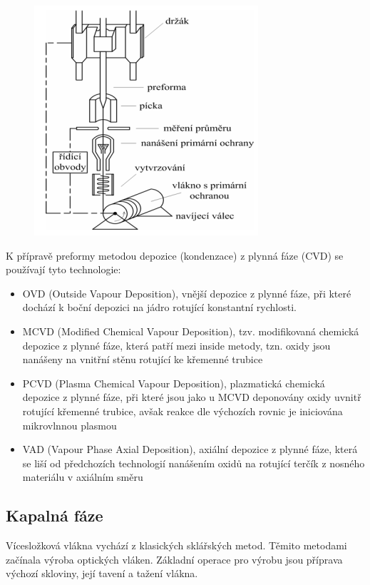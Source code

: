 \begin{figure}[!ht]
\begin{center}
    \includegraphics[scale=1]{obrazky/preforma.png}
  \end{center}
\end{figure}

K přípravě preformy metodou depozice (kondenzace) z plynná fáze (CVD) se používají tyto technologie:
\begin{itemize}
    \item OVD (Outside Vapour Deposition), vnější depozice z plynné fáze, při které dochází k boční depozici na jádro rotující konstantní rychlosti.
    \item MCVD (Modified Chemical Vapour Deposition), tzv. modifikovaná chemická depozice z plynné fáze, která patří mezi inside metody, tzn. oxidy jsou nanášeny na vnitřní stěnu rotující ke křemenné trubice
    \item PCVD (Plasma Chemical Vapour Deposition), plazmatická chemická depozice z plynné fáze, při které jsou jako u MCVD deponovány oxidy uvnitř rotující křemenné trubice, avšak reakce dle výchozích rovnic je iniciována mikrovlnnou plasmou
    \item VAD (Vapour Phase Axial Deposition), axiální depozice z plynné fáze, která se liší od předchozích technologií nanášením oxidů na rotující terčík z nosného materiálu v axiálním směru
\end{itemize}

\subsection{Kapalná fáze}
Vícesložková vlákna vychází z klasických sklářských metod. Těmito metodami začínala výroba optických vláken. Základní operace pro výrobu jsou příprava výchozí skloviny, její tavení a tažení vlákna. 

